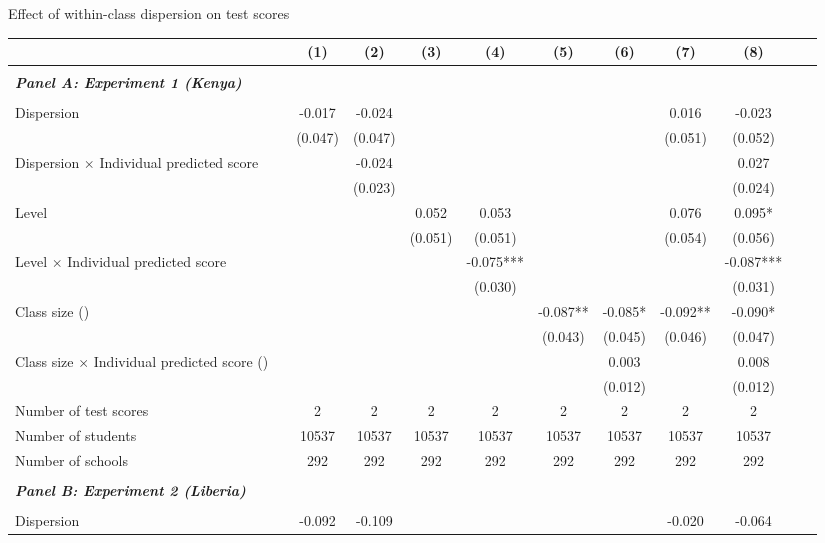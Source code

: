 \begin{center} 
\caption{\small Effect of within-class dispersion on test scores} 
\label{tab:descriptives} 
\begin{scriptsize}
\begin{threeparttable}
\begin{tabular} {@{} l l c c c c c c c c c c  @{}} \toprule \toprule
& &(1)&(2)&(3)&(4)&(5)&(6)&(7)&(8) \\ \midrule 
\\
\multicolumn{3}{l}{\textbf{\textit{Panel A: Experiment 1 (Kenya)}}} \\
\\
Dispersion &  & -0.017 & -0.024 &  &  &  &  & 0.016 & -0.023 \\
                 &  & (0.047) & (0.047) &  &  &  &  & (0.051) & (0.052) \\
Dispersion $\times$ Individual predicted score &  &  & -0.024 &  &  &  &  &  & 0.027 \\
                 &  &  & (0.023) &  &  &  &  &  & (0.024) \\
Level &  &  &  & 0.052 & 0.053 &  &  & 0.076 & 0.095* \\
                 &  &  &  & (0.051) & (0.051) &  &  & (0.054) & (0.056) \\
Level $\times$ Individual predicted score &  &  &  &  & -0.075*** &  &  &  & -0.087*** \\
                 &  &  &  &  & (0.030) &  &  &  & (0.031) \\
Class size (\times 10) &  &  &  &  &  & -0.087** & -0.085* & -0.092** & -0.090* \\
                 &  &  &  &  &  & (0.043) & (0.045) & (0.046) & (0.047) \\
Class size $\times$ Individual predicted score (\times 10) &  &  &  &  &  &  & 0.003 &  & 0.008 \\
                 &  &  &  &  &  &  & (0.012) &  & (0.012) \\
\midrule
Number of test scores &  & 2 & 2 & 2 & 2 & 2 & 2 & 2 & 2 \\
Number of students &  & 10537 & 10537 & 10537 & 10537 & 10537 & 10537 & 10537 & 10537 \\
Number of schools &  & 292 & 292 & 292 & 292 & 292 & 292 & 292 & 292 \\
 \midrule
\\
\multicolumn{3}{l}{\textbf{\textit{Panel B: Experiment 2 (Liberia)}}} \\
\\
Dispersion &  & -0.092 & -0.109 &  &  &  &  & -0.020 & -0.064 \\

\end{tabular}
\end{threeparttable}
\end{scriptsize}
\end{center}
